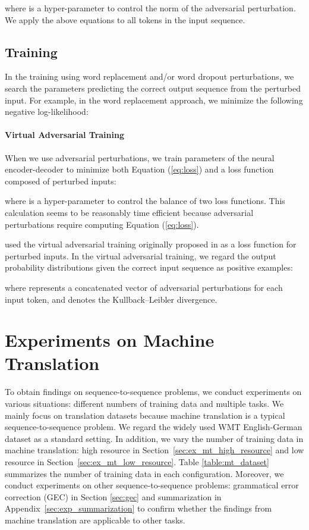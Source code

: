 \documentclass[11pt]{article}
\begin{document}
where  is a hyper-parameter to control the norm of the adversarial perturbation.
We apply the above equations to all tokens in the input sequence.


\subsection{Training}
In the training using word replacement and/or word dropout perturbations, we search the parameters predicting the correct output sequence from the perturbed input.
For example, in the word replacement approach, we minimize the following negative log-likelihood:


\paragraph{Virtual Adversarial Training}
When we use adversarial perturbations, we train parameters of the neural encoder-decoder to minimize both Equation (\ref{eq:loss}) and a loss function  composed of perturbed inputs:

where  is a hyper-parameter to control the balance of two loss functions.
This calculation seems to be reasonably time efficient because adversarial perturbations require computing Equation (\ref{eq:loss}).

 used the virtual adversarial training originally proposed in  as a loss function for perturbed inputs.
In the virtual adversarial training, we regard the output probability distributions given the correct input sequence as positive examples:

where  represents a concatenated vector of adversarial perturbations for each input token, and  denotes the Kullback–Leibler divergence.



\section{Experiments on Machine Translation}
To obtain findings on sequence-to-sequence problems, we conduct experiments on various situations: different numbers of training data and multiple tasks.
We mainly focus on translation datasets because machine translation is a typical sequence-to-sequence problem.
We regard the widely used WMT English-German dataset as a standard setting.
In addition, we vary the number of training data in machine translation: high resource in Section~\ref{sec:ex_mt_high_resource} and low resource in Section~\ref{sec:ex_mt_low_resource}.
Table \ref{table:mt_dataset} summarizes the number of training data in each configuration.
Moreover, we conduct experiments on other sequence-to-sequence problems: grammatical error correction (GEC) in Section \ref{sec:gec} and summarization in Appendix~\ref{sec:exp_summarization} to confirm whether the findings from machine translation are applicable to other tasks.
\end{document}
